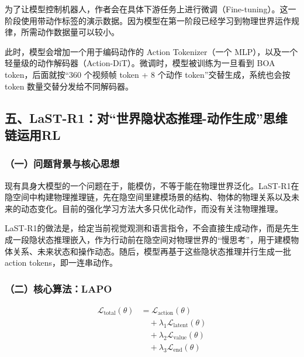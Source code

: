为了让模型控制机器人，作者会在具体下游任务上进行微调（Fine-tuning）。这一阶段使用带动作标签的演示数据。因为模型在第一阶段已经学习到物理世界运作规律，所需动作数据量可以较小。

此时，模型会增加一个用于编码动作的 Action Tokenizer（一个 MLP），以及一个轻量级的动作解码器（Action-DiT）。微调时，模型被训练为一旦看到 BOA token，后面就按``360 个视频帧 token + 8 个动作 token''交替生成，系统也会按 token 数量交替分发给不同解码器。

\hypertarget{ux4e94last-r1ux5bf9ux4e16ux754cux9690ux72b6ux6001ux63a8ux7406-ux52a8ux4f5cux751fux6210ux601dux7ef4ux94feux8fd0ux7528rl}{%
\subsection{五、LaST-R1：对``世界隐状态推理-动作生成''思维链运用RL}\label{ux4e94last-r1ux5bf9ux4e16ux754cux9690ux72b6ux6001ux63a8ux7406-ux52a8ux4f5cux751fux6210ux601dux7ef4ux94feux8fd0ux7528rl}}

\hypertarget{ux4e00ux95eeux9898ux80ccux666fux4e0eux6838ux5fc3ux601dux60f3-3}{%
\subsubsection{（一）问题背景与核心思想}\label{ux4e00ux95eeux9898ux80ccux666fux4e0eux6838ux5fc3ux601dux60f3-3}}

现有具身大模型的一个问题在于，能模仿，不等于能在物理世界泛化。LaST-R1在隐空间中构建物理推理链，先在隐空间里建模场景的结构、物体的物理关系以及未来的动态变化。目前的强化学习方法大多只优化动作，而没有关注物理推理。

LaST-R1的做法是，给定当前视觉观测和语言指令，不会直接生成动作，而是先生成一段隐状态推理嵌入，作为行动前在隐空间对物理世界的``慢思考''，用于建模物体关系、未来状态和操作动态。随后，模型再基于这些隐状态推理并行生成一批action tokens，即一连串动作。

\hypertarget{ux4e8cux6838ux5fc3ux7b97ux6cd5lapo}{%
\subsubsection{（二）核心算法：LAPO}\label{ux4e8cux6838ux5fc3ux7b97ux6cd5lapo}}

\[
\begin{aligned}
\mathcal{L}_{\mathrm{total}}(\theta)
&= \mathcal{L}_{\mathrm{action}}(\theta)
\\
&\quad + \lambda_1 \mathcal{L}_{\mathrm{latent}}(\theta)
\\
&\quad + \lambda_2 \mathcal{L}_{\mathrm{value}}(\theta)
\\
&\quad + \lambda_3 \mathcal{L}_{\mathrm{end}}(\theta)
\end{aligned}
\]

